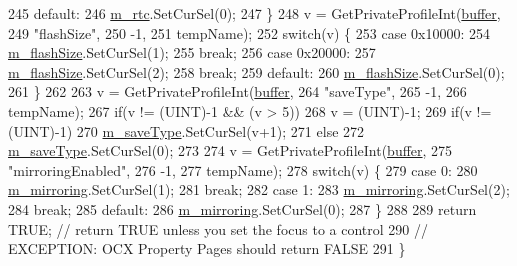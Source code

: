 \begin{DoxyCode}
245   \textcolor{keywordflow}{default}:
246     \mbox{\hyperlink{class_game_overrides_a68ff1f6bae098f28c5f7a30b90141781}{m\_rtc}}.SetCurSel(0);
247   \}
248   v = GetPrivateProfileInt(\mbox{\hyperlink{_g_b_a_8cpp_a28d4d3d8445e73a696b2d6f7eadabd96}{buffer}},
249                            \textcolor{stringliteral}{"flashSize"},
250                            -1,
251                            tempName);
252   \textcolor{keywordflow}{switch}(v) \{
253   \textcolor{keywordflow}{case} 0x10000:
254     \mbox{\hyperlink{class_game_overrides_a3f75d6a84d709bc9052eae826ae4b1c3}{m\_flashSize}}.SetCurSel(1);
255     \textcolor{keywordflow}{break};
256   \textcolor{keywordflow}{case} 0x20000:
257     \mbox{\hyperlink{class_game_overrides_a3f75d6a84d709bc9052eae826ae4b1c3}{m\_flashSize}}.SetCurSel(2);
258     \textcolor{keywordflow}{break};
259   \textcolor{keywordflow}{default}:
260     \mbox{\hyperlink{class_game_overrides_a3f75d6a84d709bc9052eae826ae4b1c3}{m\_flashSize}}.SetCurSel(0);
261   \}
262   
263   v = GetPrivateProfileInt(\mbox{\hyperlink{_g_b_a_8cpp_a28d4d3d8445e73a696b2d6f7eadabd96}{buffer}},
264                            \textcolor{stringliteral}{"saveType"},
265                            -1,
266                            tempName);
267   \textcolor{keywordflow}{if}(v != (UINT)-1 && (v > 5))
268     v = (UINT)-1;
269   \textcolor{keywordflow}{if}(v != (UINT)-1)
270     \mbox{\hyperlink{class_game_overrides_ac56384b1ec6d9198db961d3d88e5bbc7}{m\_saveType}}.SetCurSel(v+1);
271   \textcolor{keywordflow}{else}
272     \mbox{\hyperlink{class_game_overrides_ac56384b1ec6d9198db961d3d88e5bbc7}{m\_saveType}}.SetCurSel(0);
273   
274   v = GetPrivateProfileInt(\mbox{\hyperlink{_g_b_a_8cpp_a28d4d3d8445e73a696b2d6f7eadabd96}{buffer}},
275                            \textcolor{stringliteral}{"mirroringEnabled"},
276                             -1,
277                             tempName);
278   \textcolor{keywordflow}{switch}(v) \{
279   \textcolor{keywordflow}{case} 0:
280     \mbox{\hyperlink{class_game_overrides_a3aeea798546add267de2b8a59b4d6e0e}{m\_mirroring}}.SetCurSel(1);
281     \textcolor{keywordflow}{break};
282   \textcolor{keywordflow}{case} 1:
283     \mbox{\hyperlink{class_game_overrides_a3aeea798546add267de2b8a59b4d6e0e}{m\_mirroring}}.SetCurSel(2);
284     \textcolor{keywordflow}{break};
285   \textcolor{keywordflow}{default}:
286     \mbox{\hyperlink{class_game_overrides_a3aeea798546add267de2b8a59b4d6e0e}{m\_mirroring}}.SetCurSel(0);
287   \}
288 
289   \textcolor{keywordflow}{return} TRUE;  \textcolor{comment}{// return TRUE unless you set the focus to a control}
290   \textcolor{comment}{// EXCEPTION: OCX Property Pages should return FALSE}
291 \}
\end{DoxyCode}
\mbox{\label{class_game_overrides_ab007ed7280044a2b07f162f430bb2a20}} 
